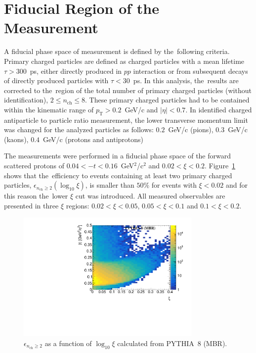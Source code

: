 \section{Fiducial Region of the Measurement}\label{section:star_fiducial}
A fiducial phase space of measurement  is defined by the~following criteria. Primary charged particles are defined as charged particles with a mean lifetime $\tau >300$~ps, either directly produced in $pp$ interaction or from subsequent decays of directly produced particles with $\tau <30$~ps. In this analysis, the~results are corrected to the~region of the total number of primary charged particles (without identification), $2\leq n_\textrm{ch} \leq 8$. These primary charged particles had to be contained within the kinematic range of $p_\textrm{T}>0.2$~GeV/c and $|\eta|<0.7$. In identified charged antiparticle to particle ratio measurement, the lower transverse momentum limit was changed for the analyzed particles as follows: $0.2$~GeV/c (pions), $0.3$~GeV/c (kaons), $0.4$~GeV/c (protons and antiprotons)

The measurements were performed in a fiducial phase space of the forward scattered protons of $0.04<-t<0.16$~GeV$^{2}$/c$^2$ and $0.02 < \xi<0.2$. Figure~\ref{fig:STARtrueMCfiducial} shows that the~efficiency  to events containing at least two primary charged particles, $\epsilon_{n_\textrm{ch}\geq 2}(\log_{10}\xi)$,  is smaller than $50\%$ for events with $\xi<0.02$ and for this reason the~lower $\xi$ cut was introduced. %
All measured observables are presented in three $\xi$ regions: $0.02<\xi<0.05$, $0.05<\xi<0.1$ and $0.1<\xi<0.2$.

\begin{figure}[h!]
	\centering
	\includegraphics[width=0.8\textwidth, page=17]{chapters/dataSampleSTAR/img/true.pdf}
	\caption{$\epsilon_{ n_\textrm{ch} \geq 2}$ as a function of $\log_{10}\xi$ calculated from PYTHIA~8 (MBR).}
	\label{fig:STARtrueMCfiducial}
\end{figure}

\FloatBarrier